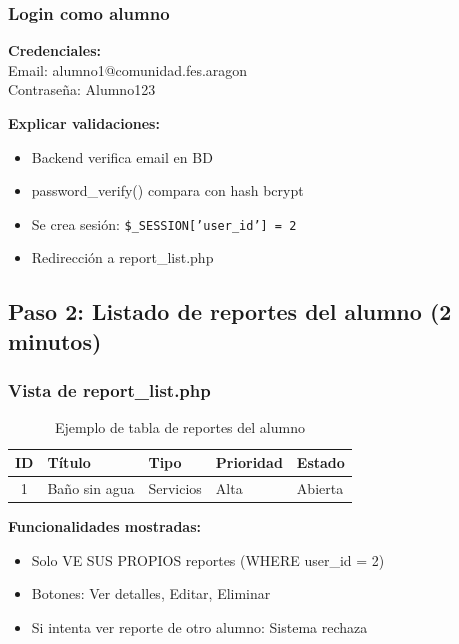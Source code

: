 \documentclass[12pt, a4paper, spanish]{article}
\begin{document}
\subsubsection{Login como alumno}

\begin{tcolorbox}[colback=codeBg, colframe=gris!50]
\textbf{Credenciales:} \\
Email: alumno1@comunidad.fes.aragon \\
Contraseña: Alumno123
\end{tcolorbox}

\textbf{Explicar validaciones:}

\begin{itemize}
    \item Backend verifica email en BD
    \item password\_verify() compara con hash bcrypt
    \item Se crea sesión: \texttt{\$\_SESSION['user\_id'] = 2}
    \item Redirección a report\_list.php
\end{itemize}

\subsection{Paso 2: Listado de reportes del alumno (2 minutos)}

\subsubsection{Vista de report\_list.php}

\begin{table}[H]
\centering
\caption{Ejemplo de tabla de reportes del alumno}
\small
\begin{tabular}{|c|l|l|l|l|}
\hline
\textbf{ID} & \textbf{Título} & \textbf{Tipo} & \textbf{Prioridad} & \textbf{Estado} \\
\hline
1 & Baño sin agua & Servicios & Alta & Abierta \\
\hline
\end{tabular}
\end{table}

\textbf{Funcionalidades mostradas:}

\begin{itemize}
    \item Solo VE SUS PROPIOS reportes (WHERE user\_id = 2)
    \item Botones: Ver detalles, Editar, Eliminar
    \item Si intenta ver reporte de otro alumno: Sistema rechaza
\end{itemize}
\end{document}
